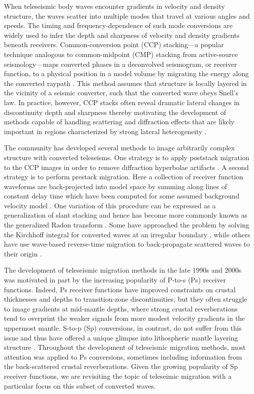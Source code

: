 \documentclass[referee]{gji}
\begin{document}
When teleseismic body waves encounter gradients in velocity and density structure, the waves scatter into multiple modes that travel at various angles and speeds.  The timing and frequency-dependence of such mode conversions are widely used to infer the depth and sharpness of velocity and density gradients beneath receivers.  Common-conversion point (CCP) stacking---a popular technique analogous to common-midpoint (CMP) stacking from active-source seismology---maps converted phases in a deconvolved seismogram, or receiver function, to a physical position in a model volume by migrating the energy along the converted raypath \citep{Dueker1997}.  This method assumes that structure is locally layered in the vicinity of a seismic converter, such that the converted wave obeys Snell's law.  In practice, however, CCP stacks often reveal dramatic lateral changes in discontinuity depth and sharpness \citep{Lekic2011a, Hansen2015} thereby motivating the development of methods capable of handling scattering and diffraction effects that are likely important in regions characterized by strong lateral heterogeneity \citep[e.g.,][]{Lekic2017}.

The community has developed several methods to image arbitrarily complex structure with converted teleseisms.  One strategy is to apply poststack migration to the CCP images in order to remove diffraction hyperbolae artifacts \citep{Chen2005}.  A second strategy is to perform prestack migration.  Here a collection of receiver function waveforms are back-projected into model space by summing along lines of constant delay time which have been computed for some assumed background velocity model \citep{Revenaugh1995, Bostock1999, Ryberg2000, Sheehan2000, Poppeliers2003, Frederiksen2004, Cheng2016}.  One variation of this procedure can be expressed as a generalization of slant stacking and hence has become more commonly known as the generalized Radon transform \citep{Bostock2001, Rondenay2005}. Some have approached the problem by solving the Kirchhoff integral for converted waves at an irregular boundary \citep{Levander2005, Wilson2005}, while others have use wave-based reverse-time migration to back-propagate scattered waves to their origin \citep{Shang2012, Shang2017}.

The development of teleseismic migration methods in the late 1990s and 2000s was motivated in part by the increasing popularity of P-to-s (Ps) receiver functions.  Indeed, Ps receiver functions have improved constraints on crustal thicknesses and depths to transition-zone discontinuities, but they often struggle to image gradients at mid-mantle depths, where strong crustal reverberations tend to overprint the weaker signals from more modest velocity gradients in the uppermost mantle.  S-to-p (Sp) conversions, in contrast, do not suffer from this issue and thus have offered a unique glimpse into lithospheric mantle layering structure \citep{Yuan2006}.  Throughout the development of teleseismic migration methods, most attention was applied to Ps conversions, sometimes including information from the back-scattered crustal reverberations.  Given the growing popularity of Sp receiver functions, we are revisiting the topic of teleseimic migration with a particular focus on this subset of converted waves.
\end{document}
